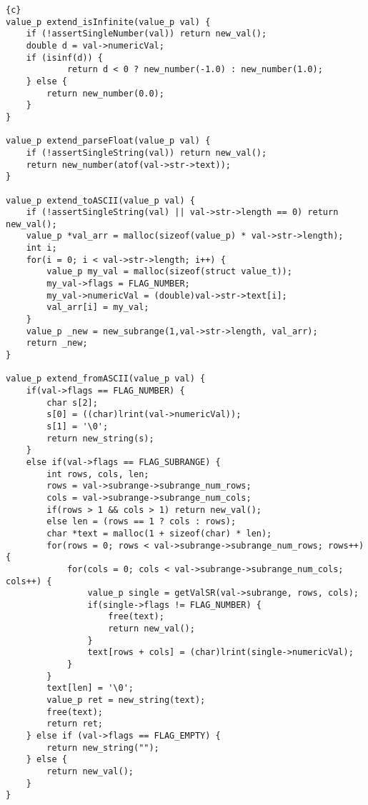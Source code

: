 \begin{lstlisting}{c}
value_p extend_isInfinite(value_p val) {
	if (!assertSingleNumber(val)) return new_val();
	double d = val->numericVal;
	if (isinf(d)) {
			return d < 0 ? new_number(-1.0) : new_number(1.0);
	} else {
		return new_number(0.0);
	}
}

value_p extend_parseFloat(value_p val) {
	if (!assertSingleString(val)) return new_val();
	return new_number(atof(val->str->text));
}

value_p extend_toASCII(value_p val) {
	if (!assertSingleString(val) || val->str->length == 0) return new_val();
	value_p *val_arr = malloc(sizeof(value_p) * val->str->length);
	int i;
	for(i = 0; i < val->str->length; i++) {
		value_p my_val = malloc(sizeof(struct value_t));
		my_val->flags = FLAG_NUMBER;
		my_val->numericVal = (double)val->str->text[i];
		val_arr[i] = my_val;
	}
	value_p _new = new_subrange(1,val->str->length, val_arr);
	return _new;
}

value_p extend_fromASCII(value_p val) {
	if(val->flags == FLAG_NUMBER) {
		char s[2];
		s[0] = ((char)lrint(val->numericVal));
		s[1] = '\0';
		return new_string(s);
	}
	else if(val->flags == FLAG_SUBRANGE) {
		int rows, cols, len;
		rows = val->subrange->subrange_num_rows;
		cols = val->subrange->subrange_num_cols;
		if(rows > 1 && cols > 1) return new_val();
		else len = (rows == 1 ? cols : rows);
		char *text = malloc(1 + sizeof(char) * len);
		for(rows = 0; rows < val->subrange->subrange_num_rows; rows++) {
			for(cols = 0; cols < val->subrange->subrange_num_cols; cols++) {
				value_p single = getValSR(val->subrange, rows, cols);
				if(single->flags != FLAG_NUMBER) {
					free(text);
					return new_val();
				}
				text[rows + cols] = (char)lrint(single->numericVal);
			}
		}
		text[len] = '\0';
		value_p ret = new_string(text);
		free(text);
		return ret;
	} else if (val->flags == FLAG_EMPTY) {
		return new_string("");
	} else {
		return new_val();
	}
}
\end{lstlisting}
